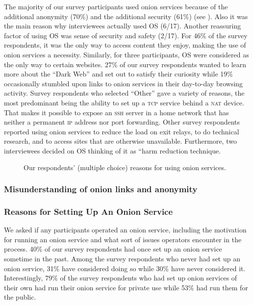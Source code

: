 The majority of our survey participants  used onion services
because of the additional anonymity (70\%) and the additional security (61\%) (see ). Also it was the main reason why interviewees actually used OS (6/17). Another reassuring factor of using OS was sense of security and safety (2/17).   
For 46\% of the survey respondents, it was the only way to access content they enjoy, making the use of
onion services a necessity. Similarly, for three participants, OS were considered as the only way to certain websites. 27\% of our survey respondents wanted to learn more about
the ``Dark Web'' and set out to satisfy their curiosity while 19\% occasionally
stumbled upon links to onion services in their day-to-day browsing activity.
Survey respondents who selected ``Other'' gave a variety of reasons, the most
predominant being the ability to set up a \textsc{tcp} service behind a
\textsc{nat} device.  That makes it possible to expose an \textsc{ssh} server in
a home network that has neither a permanent \textsc{ip} address nor port
forwarding.  Other survey respondents reported using onion services to reduce the load on exit relays, to do
technical research, and to access sites that are otherwise unavailable. Furthermore, two interviewees decided on OS thinking of it as “harm reduction technique.

\begin{figure}[t]
    \centering
    
    \caption{Our respondents' (multiple choice) reasons for using onion
    services.}
    \label{fig:onion-usage}
\end{figure}


\subsubsection{Misunderstanding of onion links and anonymity}


\subsubsection{Reasons for Setting Up An Onion Service}
We asked if any participants operated an onion service, including the motivation for
running an onion service and what sort of issues operators encounter in the
process.  40\% of our survey respondents had once set up an onion service sometime in the past.  Among the survey
respondents who never had set up an onion service, 31\% have considered doing so while 30\% have never
considered it.  Interestingly, 79\% of the survey respondents who had set up onion services of their own had run their onion service for
private use while 53\% had run them for the public.

